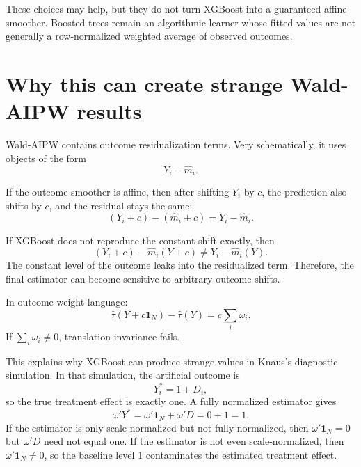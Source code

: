 \documentclass[11pt,a4paper]{article}
\begin{document}
These choices may help, but they do not turn XGBoost into a guaranteed affine
smoother. Boosted trees remain an algorithmic learner whose fitted values are not
generally a row-normalized weighted average of observed outcomes.

\section{Why this can create strange Wald-AIPW results}

Wald-AIPW contains outcome residualization terms. Very schematically, it uses
objects of the form
\begin{equation}
    Y_i - \hat m_i.
\end{equation}

If the outcome smoother is affine, then after shifting \(Y_i\) by \(c\), the
prediction also shifts by \(c\), and the residual stays the same:
\begin{equation}
    (Y_i+c)-(\hat m_i+c)=Y_i-\hat m_i.
\end{equation}

If XGBoost does not reproduce the constant shift exactly, then
\begin{equation}
    (Y_i+c)-\hat m_i(Y+c)
    \neq
    Y_i-\hat m_i(Y).
\end{equation}
The constant level of the outcome leaks into the residualized term. Therefore,
the final estimator can become sensitive to arbitrary outcome shifts.

In outcome-weight language:
\begin{equation}
    \hat\tau(Y+c\mathbf{1}_N)-\hat\tau(Y)
    =
    c\sum_i\omega_i.
\end{equation}
If \(\sum_i\omega_i\neq0\), translation invariance fails.

This explains why XGBoost can produce strange values in Knaus's diagnostic
simulation. In that simulation, the artificial outcome is
\begin{equation}
    Y_i^* = 1 + D_i,
\end{equation}
so the true treatment effect is exactly one. A fully normalized estimator gives
\begin{equation}
    \omega'Y^*
    =
    \omega'\mathbf{1}_N + \omega'D
    =
    0+1
    =
    1.
\end{equation}
If the estimator is only scale-normalized but not fully normalized, then
\(\omega'\mathbf{1}_N=0\) but \(\omega'D\) need not equal one. If the estimator is
not even scale-normalized, then \(\omega'\mathbf{1}_N\neq0\), so the baseline
level \(1\) contaminates the estimated treatment effect.
\end{document}
